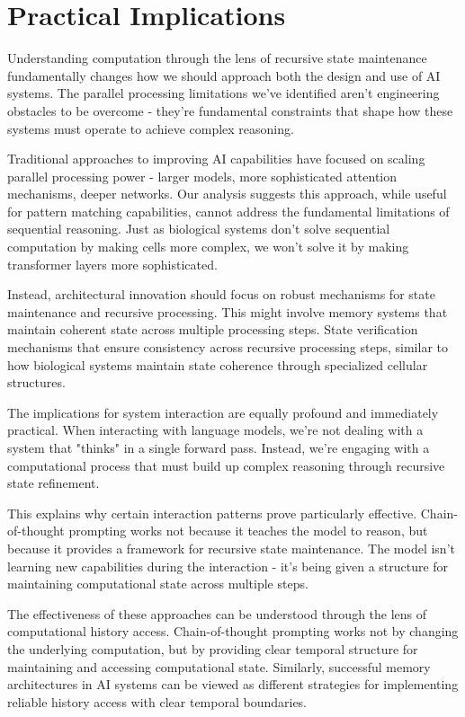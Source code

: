 \documentclass[12pt]{article}
\begin{document}
\section{Practical Implications}

Understanding computation through the lens of recursive state maintenance fundamentally changes how we should approach both the design and use of AI systems. The parallel processing limitations we've identified aren't engineering obstacles to be overcome - they're fundamental constraints that shape how these systems must operate to achieve complex reasoning.

Traditional approaches to improving AI capabilities have focused on scaling parallel processing power - larger models, more sophisticated attention mechanisms, deeper networks. Our analysis suggests this approach, while useful for pattern matching capabilities, cannot address the fundamental limitations of sequential reasoning. Just as biological systems don't solve sequential computation by making cells more complex, we won't solve it by making transformer layers more sophisticated.

Instead, architectural innovation should focus on robust mechanisms for state maintenance and recursive processing. This might involve memory systems that maintain coherent state across multiple processing steps. State verification mechanisms that ensure consistency across recursive processing steps, similar to how biological systems maintain state coherence through specialized cellular structures.

The implications for system interaction are equally profound and immediately practical. When interacting with language models, we're not dealing with a system that "thinks" in a single forward pass. Instead, we're engaging with a computational process that must build up complex reasoning through recursive state refinement.

This explains why certain interaction patterns prove particularly effective. Chain-of-thought prompting works not because it teaches the model to reason, but because it provides a framework for recursive state maintenance. The model isn't learning new capabilities during the interaction - it's being given a structure for maintaining computational state across multiple steps.

The effectiveness of these approaches can be understood through the lens of computational history access. Chain-of-thought prompting works not by changing the underlying computation, but by providing clear temporal structure for maintaining and accessing computational state. Similarly, successful memory architectures in AI systems can be viewed as different strategies for implementing reliable history access with clear temporal boundaries.
\end{document}
